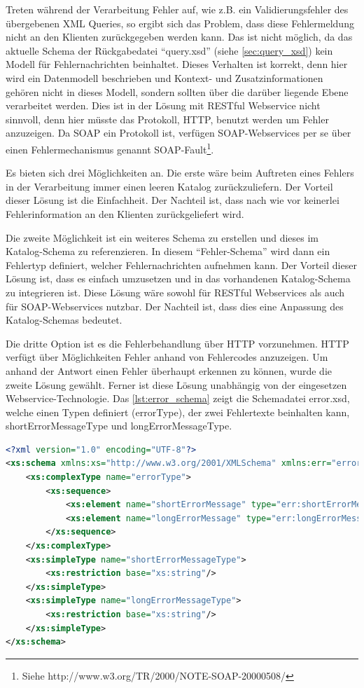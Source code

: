 Treten während der Verarbeitung Fehler auf, wie z.B. ein Validierungsfehler des übergebenen XML Queries, so ergibt sich das Problem, dass diese Fehlermeldung nicht an den Klienten zurückgegeben werden kann. Das ist nicht möglich, da das aktuelle Schema der Rückgabedatei \enquote{query.xsd}  (siehe \autoref{sec:query_xsd}) kein Modell für Fehlernachrichten beinhaltet. Dieses Verhalten ist korrekt, denn hier wird ein Datenmodell beschrieben und Kontext- und Zusatzinformationen gehören nicht in dieses Modell, sondern sollten über die darüber liegende Ebene verarbeitet werden. Dies ist in der Lösung mit \gls{REST}ful \gls{Webservice} nicht sinnvoll, denn hier müsste das Protokoll, \gls{HTTP}, benutzt werden um Fehler anzuzeigen. Da \gls{SOAP} ein Protokoll ist, verfügen \gls{SOAP}-\glspl{Webservice} per se über einen Fehlermechanismus genannt SOAP-Fault\footnote{Siehe http://www.w3.org/TR/2000/NOTE-SOAP-20000508/}. 

Es bieten sich drei Möglichkeiten an. Die erste wäre beim Auftreten eines Fehlers in der Verarbeitung immer einen leeren Katalog zurückzuliefern. Der Vorteil dieser Lösung ist die Einfachheit. Der Nachteil ist, dass nach wie vor keinerlei Fehlerinformation an den Klienten zurückgeliefert wird.

Die zweite Möglichkeit ist ein weiteres Schema zu erstellen und dieses im Katalog-Schema zu referenzieren. In diesem \enquote{Fehler-Schema} wird dann ein Fehlertyp definiert, welcher Fehlernachrichten aufnehmen kann. Der Vorteil dieser Lösung ist, dass es einfach umzusetzen und in das vorhandenen Katalog-Schema zu integrieren ist. Diese Lösung wäre sowohl für \gls{REST}ful \glspl{Webservice} als auch für \gls{SOAP}-\glspl{Webservice} nutzbar. Der Nachteil ist, dass dies eine Anpassung des Katalog-Schemas bedeutet. 

Die dritte Option ist es die Fehlerbehandlung über \gls{HTTP} vorzunehmen. \gls{HTTP} verfügt über Möglichkeiten Fehler anhand von Fehlercodes anzuzeigen. Um anhand der Antwort einen Fehler überhaupt erkennen zu können, wurde die zweite Lösung gewählt. Ferner ist diese Lösung unabhängig von der eingesetzen \gls{Webservice}-Technologie. Das \autoref{lst:error_schema} zeigt die Schemadatei error.xsd, welche einen Typen definiert (errorType), der zwei Fehlertexte beinhalten kann, shortErrorMessageType und longErrorMessageType. 

 \begin{lstlisting}[caption=Fehlerbehandlung - Error Schemadatei, language=xml, label=lst:error_schema]
<?xml version="1.0" encoding="UTF-8"?>
<xs:schema xmlns:xs="http://www.w3.org/2001/XMLSchema" xmlns:err="error" targetNamespace="error" elementFormDefault="qualified" attributeFormDefault="unqualified">
	<xs:complexType name="errorType">
		<xs:sequence>
			<xs:element name="shortErrorMessage" type="err:shortErrorMessageType" />
			<xs:element name="longErrorMessage" type="err:longErrorMessageType" />
		</xs:sequence>
	</xs:complexType>
	<xs:simpleType name="shortErrorMessageType">
		<xs:restriction base="xs:string"/>
	</xs:simpleType>
	<xs:simpleType name="longErrorMessageType">
		<xs:restriction base="xs:string"/>
	</xs:simpleType>
</xs:schema>
\end{lstlisting}

